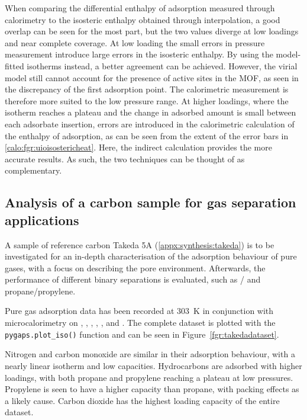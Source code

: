 When comparing the differential enthalpy of adsorption measured through
calorimetry to the isosteric enthalpy obtained through interpolation, 
a good overlap can be seen for the most part, but the two values
diverge at low loadings and near complete coverage. 
At low loading the small errors in pressure measurement introduce
large errors in the isosteric enthalpy. By using the model-fitted 
isotherms instead, a better agreement can be achieved. However, the 
virial model still cannot account for the presence of active sites in the 
MOF, as seen in the discrepancy of the first adsorption point.
The calorimetric measurement is therefore more suited to the low pressure
range. At higher loadings, where the isotherm reaches a plateau and
the change in adsorbed amount is small between each adsorbate
insertion, errors are introduced in the calorimetric calculation of
the enthalpy of adsorption, as can be seen from the extent of the error
bars in \autoref{calo:fgr:uioisostericheat}.
Here, the indirect calculation provides the more accurate results.
As such, the two techniques can be thought of as complementary.

\subsection{Analysis of a carbon sample for gas separation applications}

A sample of reference carbon Takeda 5A (\autoref{appx:synthesis:takeda})
is to be investigated for an in-depth characterisation of
the adsorption behaviour of pure gases, with a focus on describing the pore environment.
Afterwards, the performance of different binary separations is evaluated,
such as / and propane/propylene.

Pure gas adsorption data has been recorded at \SI{303}{\kelvin} in
conjunction with
microcalorimetry on , , , , ,
 and . The complete dataset is plotted with the
\lstinline{pygaps.plot_iso()} function and can be seen in Figure~\ref{fgr:takedadataset}.

Nitrogen and carbon monoxide are similar in their adsorption behaviour,
with a nearly linear isotherm and low capacities.
Hydrocarbons are adsorbed with higher loadings, with both propane and propylene
reaching a plateau at low pressures. Propylene is seen to have a
higher capacity than propane, with packing effects as a likely cause.
Carbon dioxide has the highest loading capacity of the entire dataset.

